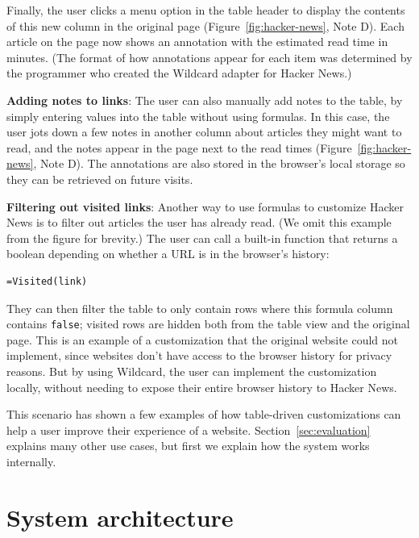 \documentclass[sigplan,screen,10pt,anonymous,review]{acmart}
\begin{document}
Finally, the user clicks a menu option in the table header to display
the contents of this new column in the original page
(Figure~\ref{fig:hacker-news}, Note D). Each article on the page now
shows an annotation with the estimated read time in minutes. (The format
of how annotations appear for each item was determined by the programmer
who created the Wildcard adapter for Hacker News.)

\textbf{Adding notes to links}: The user can also manually add notes to
the table, by simply entering values into the table without using
formulas. In this case, the user jots down a few notes in another column
about articles they might want to read, and the notes appear in the page
next to the read times (Figure~\ref{fig:hacker-news}, Note D). The
annotations are also stored in the browser's local storage so they can
be retrieved on future visits.

\textbf{Filtering out visited links}: Another way to use formulas to
customize Hacker News is to filter out articles the user has already
read. (We omit this example from the figure for brevity.) The user can
call a built-in function that returns a boolean depending on whether a
URL is in the browser's history:

\begin{verbatim}
=Visited(link)
\end{verbatim}

They can then filter the table to only contain rows where this formula
column contains \texttt{false}; visited rows are hidden both from the
table view and the original page. This is an example of a customization
that the original website could not implement, since websites don't have
access to the browser history for privacy reasons. But by using
Wildcard, the user can implement the customization locally, without
needing to expose their entire browser history to Hacker News.

This scenario has shown a few examples of how table-driven
customizations can help a user improve their experience of a website.
Section~\ref{sec:evaluation} explains many other use cases, but first we
explain how the system works internally.

\hypertarget{sec:architecture}{%
\section{System architecture}\label{sec:architecture}}
\end{document}
